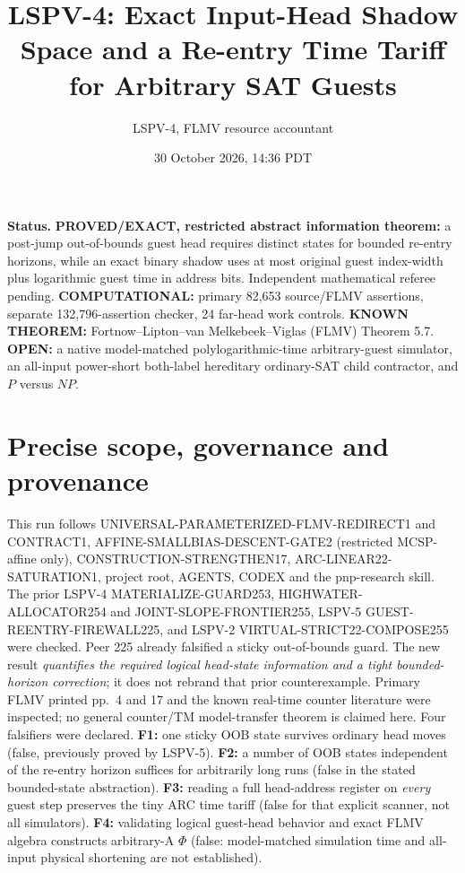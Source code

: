 \documentclass[10pt]{article}
\title{LSPV-4: Exact Input-Head Shadow Space and a Re-entry Time Tariff for Arbitrary SAT Guests}
\author{LSPV-4, FLMV resource accountant}
\date{30 October 2026, 14:36 PDT}
\begin{document}
\maketitle
\noindent\textbf{Status.} \textbf{PROVED/EXACT, restricted abstract information theorem:} a post-jump out-of-bounds guest head requires distinct states for bounded re-entry horizons, while an exact binary shadow uses at most original guest index-width plus logarithmic guest time in address bits. Independent mathematical referee pending. \textbf{COMPUTATIONAL:} primary 82,653 source/FLMV assertions, separate 132,796-assertion checker, 24 far-head work controls. \textbf{KNOWN THEOREM:} Fortnow--Lipton--van Melkebeek--Viglas (FLMV) Theorem 5.7. \textbf{OPEN:} a native model-matched polylogarithmic-time arbitrary-guest simulator, an all-input power-short both-label hereditary ordinary-SAT child contractor, and $P$ versus $NP$.
\section{Precise scope, governance and provenance}
This run follows UNIVERSAL-PARAMETERIZED-FLMV-REDIRECT1 and CONTRACT1, AFFINE-SMALLBIAS-DESCENT-GATE2 (restricted MCSP-affine only), CONSTRUCTION-STRENGTHEN17, ARC-LINEAR22-SATURATION1, project root, AGENTS, CODEX and the pnp-research skill. The prior LSPV-4 MATERIALIZE-GUARD253, HIGHWATER-ALLOCATOR254 and JOINT-SLOPE-FRONTIER255, LSPV-5 GUEST-REENTRY-FIREWALL225, and LSPV-2 VIRTUAL-STRICT22-COMPOSE255 were checked. Peer 225 already falsified a sticky out-of-bounds guard. The new result \emph{quantifies the required logical head-state information and a tight bounded-horizon correction}; it does not rebrand that prior counterexample. Primary FLMV printed pp.~4 and 17 and the known real-time counter literature were inspected; no general counter/TM model-transfer theorem is claimed here.
Four falsifiers were declared. \textbf{F1:} one sticky OOB state survives ordinary head moves (false, previously proved by LSPV-5). \textbf{F2:} a number of OOB states independent of the re-entry horizon suffices for arbitrarily long runs (false in the stated bounded-state abstraction). \textbf{F3:} reading a full head-address register on \emph{every} guest step preserves the tiny ARC time tariff (false for that explicit scanner, not all simulators). \textbf{F4:} validating logical guest-head behavior and exact FLMV algebra constructs arbitrary-A $\Phi$ (false: model-matched simulation time and all-input physical shortening are not established).
\end{document}

